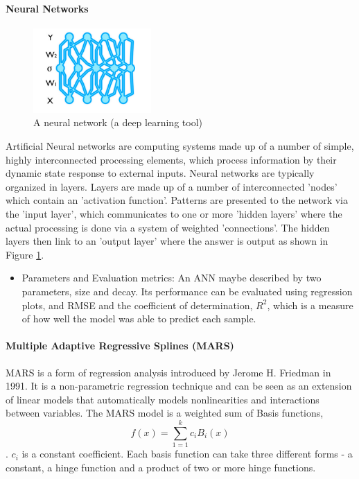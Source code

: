 \documentclass[letterpaper,12pt,titlepage,oneside,final]{report}
\begin{document}
                \paragraph{Neural Networks}
                    \begin{figure}[!h]
                        \centering
                        \includegraphics[width=0.4\textwidth]{anns}
                        \caption{A neural network (a deep learning tool) \cite{What93:online}}
                        \label{anns}
                    \end{figure}
                    Artificial Neural networks are computing systems made up of a number of simple, highly interconnected processing elements, which process information by their dynamic state response to external inputs. Neural networks are typically organized in layers. Layers are made up of a number of interconnected 'nodes' which contain an 'activation function'. Patterns are presented to the network via the 'input layer', which communicates to one or more 'hidden layers' where the actual processing is done via a system of weighted 'connections'. The hidden layers then link to an 'output layer' where the answer is output as shown in Figure \ref{anns}.
                    \begin{itemize}
                        \item{Parameters and Evaluation metrics:}
                            An ANN maybe described by two parameters, size and decay. Its performance can be evaluated using regression plots, and RMSE and the coefficient of determination, $R^2$, which is a measure of how well the model was able to predict each sample.
                    \end{itemize}

                \paragraph{Multiple Adaptive Regressive Splines (MARS)}
                    MARS is a form of regression analysis introduced by Jerome H. Friedman in 1991. It is a non-parametric regression technique and can be seen as an extension of linear models that automatically models nonlinearities and interactions between variables. The MARS model is a weighted sum of Basis functions, $$f(x) = \sum_{1=1}^{k}c_i B_i(x)$$ \cite{friedman1991multivariate}. $c_i$ is a constant coefficient. Each basis function can take three different forms - a constant, a hinge function and a product of two or more hinge functions.
\end{document}

